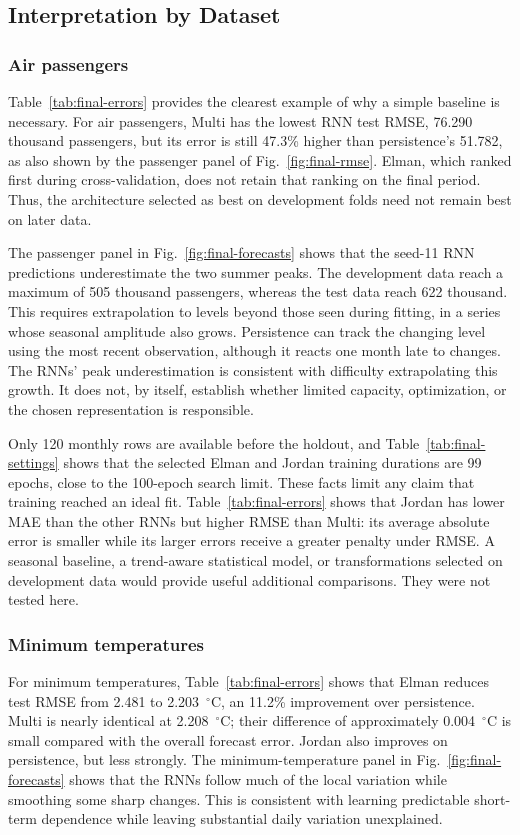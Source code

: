 \subsection{Interpretation by Dataset}

\subsubsection{Air passengers}
Table~\ref{tab:final-errors} provides the clearest example of why a simple
baseline is necessary. For air passengers, Multi has the lowest RNN test RMSE,
76.290 thousand passengers, but its error is still 47.3\% higher than
persistence's 51.782, as also shown by the passenger panel of
Fig.~\ref{fig:final-rmse}. Elman, which ranked first during cross-validation,
does not retain that ranking on the final period. Thus, the architecture
selected as best on development folds need not remain best on later data.

The passenger panel in Fig.~\ref{fig:final-forecasts} shows that the seed-11 RNN
predictions underestimate the two summer peaks. The development data reach a
maximum of 505 thousand passengers, whereas the test data reach 622 thousand.
This requires extrapolation to levels beyond those seen during fitting, in a
series whose seasonal amplitude also grows. Persistence can track the changing
level using the most recent observation, although it reacts one month late to
changes. The RNNs' peak underestimation is consistent with difficulty
extrapolating this growth. It does not, by itself, establish whether limited
capacity, optimization, or the chosen representation is responsible.

Only 120 monthly rows are available before the holdout, and
Table~\ref{tab:final-settings} shows that the selected Elman and Jordan training
durations are 99 epochs, close to the 100-epoch search limit. These facts limit
any claim that training reached an ideal fit. Table~\ref{tab:final-errors} shows
that Jordan has lower MAE than the other RNNs but higher RMSE than Multi: its
average absolute error is smaller while its larger errors receive a greater
penalty under RMSE. A seasonal baseline, a trend-aware statistical model, or
transformations selected on development data would provide useful additional
comparisons. They were not tested here.

\subsubsection{Minimum temperatures}
For minimum temperatures, Table~\ref{tab:final-errors} shows that Elman reduces
test RMSE from 2.481 to 2.203~$^\circ$C, an 11.2\% improvement over persistence.
Multi is nearly identical at 2.208~$^\circ$C; their difference of approximately
0.004~$^\circ$C is small compared with the overall forecast error. Jordan also
improves on persistence, but less strongly. The minimum-temperature panel in
Fig.~\ref{fig:final-forecasts} shows that the RNNs follow much of the local
variation while smoothing some sharp changes. This is consistent with learning
predictable short-term dependence while leaving substantial daily variation
unexplained.

